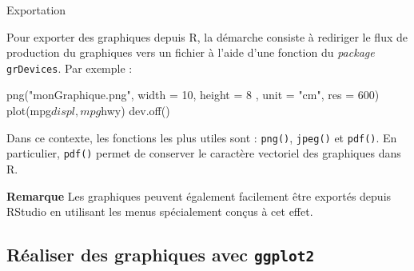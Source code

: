 \documentclass[12pt,ignorenonframetext,]{beamer}
\newenvironment{Shaded}{}{}
\newcommand{\KeywordTok}[1]{\textcolor[rgb]{0.00,0.00,1.00}{#1}}
\newcommand{\DataTypeTok}[1]{#1}
\newcommand{\DecValTok}[1]{#1}
\newcommand{\StringTok}[1]{\textcolor[rgb]{0.00,0.50,0.50}{#1}}
\newcommand{\OperatorTok}[1]{#1}
\newcommand{\NormalTok}[1]{#1}
\renewenvironment{Shaded}{\begin{snugshade}}{\end{snugshade}}
\begin{document}
\begin{frame}[fragile]{Exportation}

Pour exporter des graphiques depuis R, la démarche consiste à rediriger
le flux de production du graphiques vers un fichier à l'aide d'une
fonction du \emph{package} \texttt{grDevices}. Par exemple :

\pause 

\begin{Shaded}
\begin{Highlighting}[]
\KeywordTok{png}\NormalTok{(}\StringTok{"monGraphique.png"}\NormalTok{, }\DataTypeTok{width =} \DecValTok{10}\NormalTok{, }\DataTypeTok{height =} \DecValTok{8}
\NormalTok{    , }\DataTypeTok{unit =} \StringTok{"cm"}\NormalTok{, }\DataTypeTok{res =} \DecValTok{600}\NormalTok{)}
\KeywordTok{plot}\NormalTok{(mpg}\OperatorTok{$}\NormalTok{displ, mpg}\OperatorTok{$}\NormalTok{hwy)}
\KeywordTok{dev.off}\NormalTok{()}
\end{Highlighting}
\end{Shaded}

\pause Dans ce contexte, les fonctions les plus utiles sont :
\texttt{png()}, \texttt{jpeg()} et \texttt{pdf()}. En particulier,
\texttt{pdf()} permet de conserver le caractère vectoriel des graphiques
dans R.

\pause 

\textbf{Remarque} Les graphiques peuvent également facilement être
exportés depuis RStudio en utilisant les menus spécialement conçus à cet
effet.

\end{frame}

\subsection{\texorpdfstring{Réaliser des graphiques avec
\protect\texttt{ggplot2}}{Réaliser des graphiques avec }}\label{realiser-des-graphiques-avec}
\end{document}
